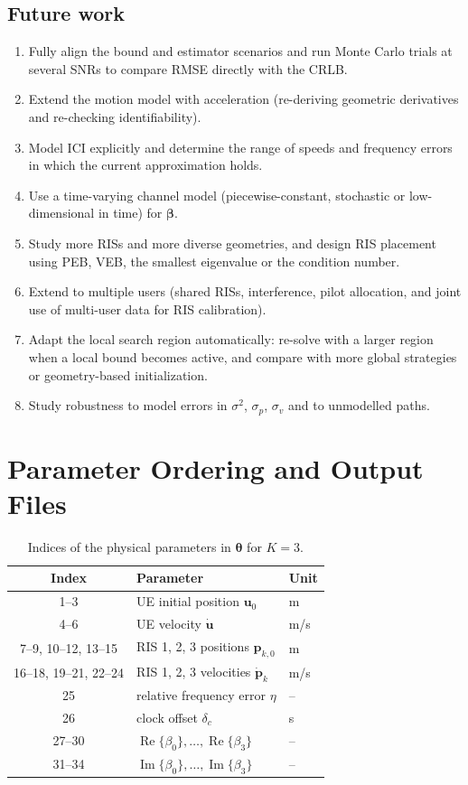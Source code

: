 \documentclass[11pt,a4paper]{article}
\newcommand{\vect}[1]{\bm{#1}}
\newcommand{\udot}{\dot{\vect{u}}}
\newcommand{\pdot}{\dot{\vect{p}}}
\renewcommand{\Re}{\operatorname{Re}}
\renewcommand{\Im}{\operatorname{Im}}
\begin{document}
\subsection{Future work}
\begin{enumerate}
\item Fully align the bound and estimator scenarios and run Monte Carlo trials at several SNRs to compare RMSE
directly with the CRLB.
\item Extend the motion model with acceleration (re-deriving geometric derivatives and re-checking
identifiability).
\item Model ICI explicitly and determine the range of speeds and frequency errors in which the current
approximation holds.
\item Use a time-varying channel model (piecewise-constant, stochastic or low-dimensional in time) for
$\vect{\beta}$.
\item Study more RISs and more diverse geometries, and design RIS placement using PEB, VEB, the smallest
eigenvalue or the condition number.
\item Extend to multiple users (shared RISs, interference, pilot allocation, and joint use of multi-user data for
RIS calibration).
\item Adapt the local search region automatically: re-solve with a larger region when a local bound becomes
active, and compare with more global strategies or geometry-based initialization.
\item Study robustness to model errors in $\sigma^2$, $\sigma_p$, $\sigma_v$ and to unmodelled paths.
\end{enumerate}

\appendix
\section{Parameter Ordering and Output Files}

\begin{table}[H]
\centering
\caption{Indices of the physical parameters in $\vect{\theta}$ for $K=3$.}
\begin{tabular}{cll}
\toprule
Index & Parameter & Unit\\
\midrule
1--3 & UE initial position $\vect{u}_0$ & m\\
4--6 & UE velocity $\udot$ & m/s\\
7--9, 10--12, 13--15 & RIS 1, 2, 3 positions $\vect{p}_{k,0}$ & m\\
16--18, 19--21, 22--24 & RIS 1, 2, 3 velocities $\pdot_k$ & m/s\\
25 & relative frequency error $\eta$ & --\\
26 & clock offset $\delta_c$ & s\\
\midrule
27--30 & $\Re\{\beta_0\},\dots,\Re\{\beta_3\}$ & --\\
31--34 & $\Im\{\beta_0\},\dots,\Im\{\beta_3\}$ & --\\
\bottomrule
\end{tabular}
\end{table}
\end{document}
